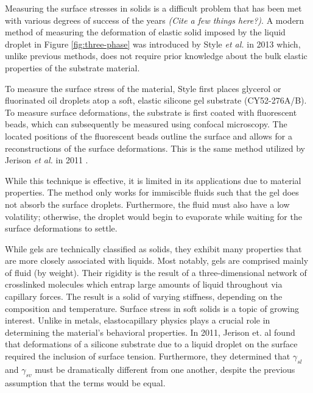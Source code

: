 Measuring the surface stresses in solids is a difficult problem that has been met with various degrees of success of the years \emph{(Cite a few things here?)}. A modern method of measuring the deformation of elastic solid imposed by the liquid droplet in Figure \ref{fig:three-phase} was introduced by Style \emph{et al.} in 2013 \cite{style2013universal} which, unlike previous methods, does not require prior knowledge about the bulk elastic properties of the substrate material.



To measure the surface stress of the material, Style first places glycerol or fluorinated oil droplets atop a soft, elastic silicone gel substrate (CY52-276A/B). To measure surface deformations, the substrate is first coated with fluorescent beads, which can subsequently be measured using confocal microscopy. The located positions of the fluorescent beads outline the surface and allows for a reconstructions of the surface deformations. This is the same method utilized by Jerison \emph{et al.} in 2011  \cite{jerison2011deformation}.

While this technique is effective, it is limited in its applications due to material properties. The method only works for immiscible fluids such that the gel does not absorb the surface droplets. Furthermore, the fluid must also have a low volatility; otherwise, the droplet would begin to evaporate while waiting for the surface deformations to settle.

While gels are technically classified as solids, they exhibit many properties that are more closely associated with liquids. Most notably, gels are comprised mainly of fluid (by weight). Their rigidity is the result of a three-dimensional network of crosslinked molecules which entrap large amounts of liquid throughout via capillary forces. The result is a solid of varying stiffness, depending on the composition and temperature. Surface stress in soft solids is a topic of growing interest. Unlike in metals, elastocapillary physics plays a crucial role in determining the material's behavioral properties. In 2011, Jerison et. al \cite{jerison2011deformation} found that deformations of a silicone substrate due to a liquid droplet on the surface required the inclusion of surface tension. Furthermore, they determined that $\gamma_{sl}$ and $\gamma_{sv}$ must be dramatically different from one another, despite the previous assumption that the terms would be equal.

